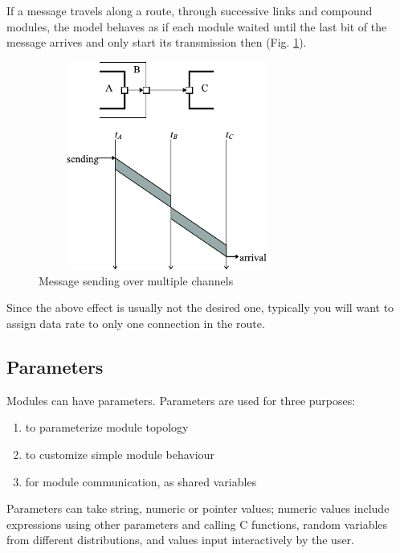 If a message travels along a route, through successive links and
compound modules, the model behaves as if each module waited until the
last bit of the message arrives and only start its transmission then
(Fig. \ref{fig:ch-overview:msg-multiple-ch}).

\begin{figure}[htbp]
\begin{center}
\includegraphics[width=3.330in, height=2.692in]{figures/usmanFig5}
\caption{Message sending over multiple channels}
\label{fig:ch-overview:msg-multiple-ch}
\end{center}
\end{figure}

Since the above effect is usually not the desired one, typically
you will want to assign data rate to only one connection in the
route.


\subsection{Parameters}

Modules can have parameters. Parameters are used for three purposes:
\begin{enumerate}
  \item{to parameterize module topology}
  \item{to customize simple module behaviour}
  \item{for module communication, as shared variables}
\end{enumerate}

Parameters can take string, numeric or pointer values; numeric
values include expressions using other parameters and calling
C functions, random variables from different distributions, and
values input interactively by the user.


